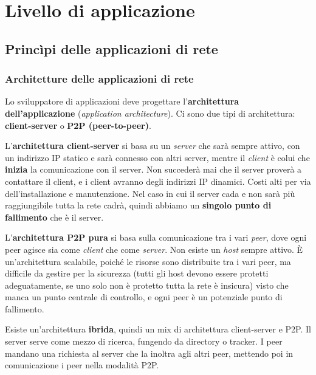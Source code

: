 \section{Livello di applicazione}

\subsection{Princìpi delle applicazioni di rete}

\subsubsection{Architetture delle applicazioni di rete}
Lo sviluppatore di applicazioni deve progettare l'\textbf{architettura dell'applicazione} (\textit{application architecture}). Ci sono due tipi di architettura: \textbf{client-server} o \textbf{P2P (peer-to-peer)}.

L'\textbf{architettura client-server} si basa su un \textit{server} che sarà sempre attivo, con un indirizzo IP statico e sarà connesso con altri server, mentre il \textit{client} è colui che \textbf{inizia} la comunicazione con il server. Non succederà mai che il server proverà a contattare il client, e i client avranno degli indirizzi IP dinamici. Costi alti per via dell'installazione e manutenzione. Nel caso in cui il server cada e non sarà più raggiungibile tutta la rete cadrà, quindi abbiamo un \textbf{singolo punto di fallimento} che è il server.

L'\textbf{architettura P2P pura} si basa sulla comunicazione tra i vari \textit{peer}, dove ogni peer agisce sia come \textit{client} che come \textit{server}. Non esiste un \textit{host} sempre attivo. È un'architettura scalabile, poiché le risorse sono distribuite tra i vari peer, ma difficile da gestire per la sicurezza (tutti gli host devono essere protetti adeguatamente, se uno solo non è protetto tutta la rete è insicura) visto che manca un punto centrale di controllo, e ogni peer è un potenziale punto di fallimento.

Esiste un'architettura \textbf{ibrida}, quindi un mix di architettura client-server e P2P. Il server serve come mezzo di ricerca, fungendo da directory o tracker. I peer mandano una richiesta al server che la inoltra agli altri peer, mettendo poi in comunicazione i peer nella modalità P2P.

